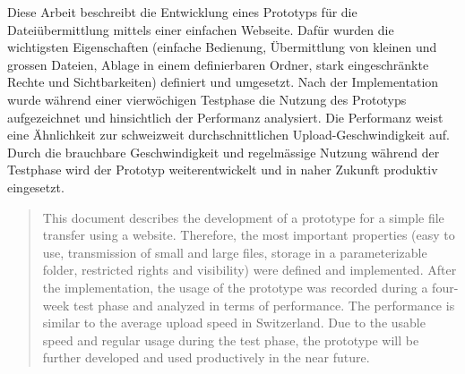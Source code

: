 \begin{zusammenfassung}
Diese Arbeit beschreibt die Entwicklung eines Prototyps für die Dateiübermittlung mittels einer einfachen Webseite.
    Dafür wurden die wichtigsten Eigenschaften (einfache Bedienung, 
    Übermittlung von kleinen und grossen Dateien, 
    Ablage in einem definierbaren Ordner, 
    stark eingeschränkte Rechte und Sichtbarkeiten) 
    definiert und umgesetzt. Nach der Implementation wurde während einer vierwöchigen Testphase die Nutzung des Prototyps aufgezeichnet 
    und hinsichtlich der Performanz analysiert. 
    Die Performanz weist eine Ähnlichkeit zur schweizweit durchschnittlichen Upload-Geschwindigkeit auf.
    Durch die brauchbare Geschwindigkeit und regelmässige Nutzung während der Testphase wird der Prototyp weiterentwickelt und in naher Zukunft produktiv eingesetzt.
\end{zusammenfassung}
    
\begin{abstract}
    This document describes the development of a prototype for a simple file transfer using a website.
    Therefore, the most important properties (easy to use,
    transmission of small and large files,
    storage in a parameterizable folder,
    restricted rights and visibility)
    were defined and implemented. 
    After the implementation, the usage of the prototype was recorded during a four-week test phase
    and analyzed in terms of performance.
    The performance is similar to the average upload speed in Switzerland.
    Due to the usable speed and regular usage during the test phase, 
    the prototype will be further developed and used productively in the near future.

\end{abstract}